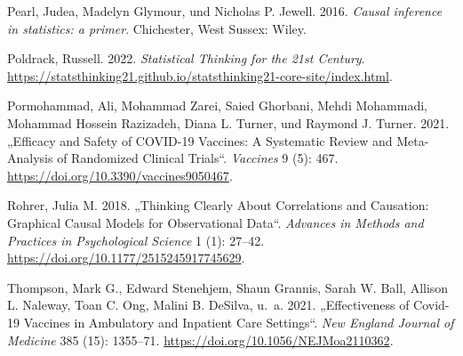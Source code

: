 \documentclass[
  a4paper,
  DIV=11]{scrreprt}
\newlength{\cslhangindent}
\newlength{\cslentryspacingunit} %
\newenvironment{CSLReferences}[2] %
 {%
  \setlength{\parindent}{0pt}
  \ifodd #1
  \let\oldpar\par
  \def\par{\hangindent=\cslhangindent\oldpar}
  \fi
  \setlength{\parskip}{#2\cslentryspacingunit}
 }%
 {}
\theoremstyle{definition}
\theoremstyle{remark}
\begin{document}
\begin{CSLReferences}{1}{0}
\leavevmode{}%
Pearl, Judea, Madelyn Glymour, und Nicholas P. Jewell. 2016.
\emph{Causal inference in statistics: a primer}. Chichester, West
Sussex: Wiley.

\leavevmode{}%
Poldrack, Russell. 2022. \emph{Statistical Thinking for the 21st
Century}.
\url{https://statsthinking21.github.io/statsthinking21-core-site/index.html}.

\leavevmode{}%
Pormohammad, Ali, Mohammad Zarei, Saied Ghorbani, Mehdi Mohammadi,
Mohammad Hossein Razizadeh, Diana L. Turner, und Raymond J. Turner.
2021. {„Efficacy and Safety of {COVID}-19 Vaccines: A Systematic Review
and Meta-Analysis of Randomized Clinical Trials``}. \emph{Vaccines} 9
(5): 467. \url{https://doi.org/10.3390/vaccines9050467}.

\leavevmode{}%
Rohrer, Julia M. 2018. {„Thinking Clearly About Correlations and
Causation: Graphical Causal Models for Observational Data``}.
\emph{Advances in Methods and Practices in Psychological Science} 1 (1):
27--42. \url{https://doi.org/10.1177/2515245917745629}.

\leavevmode{}%
Thompson, Mark G., Edward Stenehjem, Shaun Grannis, Sarah W. Ball,
Allison L. Naleway, Toan C. Ong, Malini B. DeSilva, u.~a. 2021.
{„Effectiveness of Covid-19 Vaccines in Ambulatory and Inpatient Care
Settings``}. \emph{New England Journal of Medicine} 385 (15): 1355--71.
\url{https://doi.org/10.1056/NEJMoa2110362}.

\end{CSLReferences}
\end{document}
